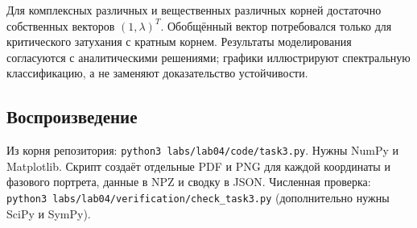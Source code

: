 Для комплексных различных и вещественных различных корней достаточно собственных векторов $(1,\lambda)^T$. Обобщённый вектор потребовался только для критического затухания с кратным корнем. Результаты моделирования согласуются с аналитическими решениями; графики иллюстрируют спектральную классификацию, а не заменяют доказательство устойчивости.

\subsection{Воспроизведение}

Из корня репозитория: \texttt{python3 labs/lab04/code/task3.py}. Нужны NumPy и Matplotlib. Скрипт создаёт отдельные PDF и PNG для каждой координаты и фазового портрета, данные в NPZ и сводку в JSON. Численная проверка: \texttt{python3 labs/lab04/verification/check\_task3.py} (дополнительно нужны SciPy и SymPy).
